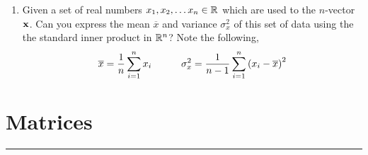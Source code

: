 \documentclass[
10pt, %
a4paper, %
oneside, %
headinclude,footinclude, %
BCOR5mm, %
]{scrartcl}
\def\mf{\ensuremath\mathbf}
\def\mb{\ensuremath\mathbb}
\begin{document}
\begin{enumerate}
\item Given a set of real numbers $x_1, x_2, \ldots x_n \in \mb{R}$ which are used to the $n$-vector $\mf{x}$. Can you express the mean $\overline{x}$ and variance $\sigma_x^2$ of this set of data using the the standard inner product in $\mb{R}^n$? Note the following,
\[ \overline{x} = \frac{1}{n}\sum_{i=1}^n x_i \quad \quad \quad \sigma_x^2 = \frac{1}{n-1}\sum_{i=1}^n \left( x_i - \overline{x}\right)^2 \]
\end{enumerate}

\newpage

\section{Matrices}
\hrule
\vspace{0.5cm}
\end{document}
